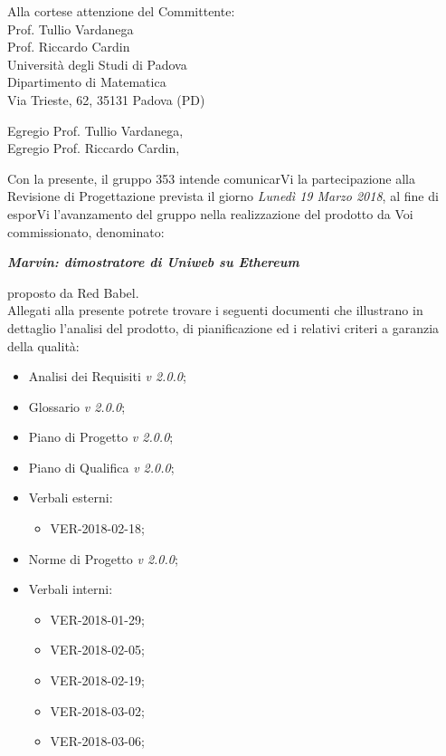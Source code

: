 \documentclass[openany, a4paper, 12pt]{letter}
\newcommand{\vrdue}{\textit{v 2.0.0}\xspace} %
\begin{document}
	
	\begin{letter}{
			Alla cortese attenzione del Committente:\\
			\smallskip
			Prof. Tullio Vardanega\\
			Prof. Riccardo Cardin\\
			\medskip
			Università degli Studi di Padova \\
			Dipartimento di Matematica\\
			Via Trieste, 62, 35131 Padova (PD)}
		\opening{Egregio Prof. Tullio Vardanega, \\
			Egregio Prof. Riccardo Cardin,}
		\thispagestyle{plain}
		Con la presente, il gruppo 353 intende comunicarVi la partecipazione alla Revisione di Progettazione prevista il giorno \textit{Lunedì 19 Marzo 2018}, al fine di esporVi l'avanzamento del gruppo nella realizzazione del prodotto da Voi commissionato, denominato: \\
		\begin{center}
			\emph{\textbf{Marvin: dimostratore di Uniweb su Ethereum}}\medskip \\
		\end{center}
		proposto da Red Babel.\medskip\\
		Allegati alla presente potrete trovare i seguenti documenti che illustrano in dettaglio l'analisi del prodotto, di pianificazione ed i relativi criteri a garanzia della qualità: 
		\begin{itemize}
			\item Analisi dei Requisiti \vrdue;
			\item Glossario \vrdue;
			\item Piano di Progetto \vrdue;
			\item Piano di Qualifica \vrdue;
			\item Verbali esterni:
			\begin{itemize}
				\item VER-2018-02-18;
			\end{itemize}
			\item Norme di Progetto \vrdue;
			\item Verbali interni:
			\begin{itemize}
				\item VER-2018-01-29;
				\item VER-2018-02-05;
				\item VER-2018-02-19;
				\item VER-2018-03-02;
				\item VER-2018-03-06;
			\end{itemize}
		\end{itemize}
		

\end{letter}
\end{document}
